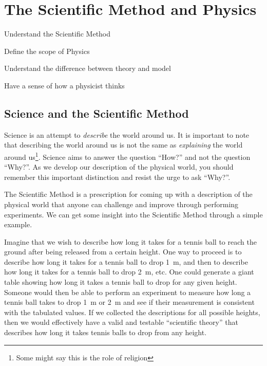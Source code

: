 %
\chapter{The Scientific Method and Physics}
\label{chap:1_Introduction}

\begin{learningObjectives}
\item Understand the Scientific Method
\item Define the scope of Physics
\item Understand the difference between theory and model
\item Have a sense of how a physicist thinks
\end{learningObjectives}

\section{Science and the Scientific Method}
Science is an attempt to \textit{describe} the world around us. It is important to note that describing the world around us is not the same as \textit{explaining} the world around us\footnote{Some might say this is the role of religion}. Science aims to answer the question ``How?'' and not the question ``Why?''. As we develop our description of the physical world, you should remember this important distinction and resist the urge to ask ``Why?''.

The Scientific Method is a prescription for coming up with a description of the physical world that anyone can challenge and improve through performing experiments. We can get some insight into the Scientific Method through a simple example. 

Imagine that we wish to describe how long it takes for a tennis ball to reach the ground after being released from a certain height. One way to proceed is to describe how long it takes for a tennis ball to drop \SI{1}{\meter}, and then to describe how long it takes for a tennis ball to drop \SI{2}{\meter}, etc. One could generate a giant table showing how long it takes a tennis ball to drop for any given height. Someone would then be able to perform an experiment to measure how long a tennis ball takes to drop \SI{1}{\meter} or \SI{2}{\meter} and see if their measurement is consistent with the tabulated values. If we collected the descriptions for all possible heights, then we would effectively have a valid and testable ``scientific theory'' that describes how long it takes tennis balls to drop from any height.

